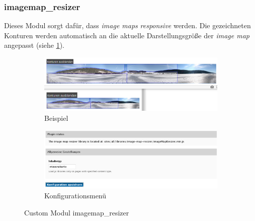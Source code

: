 \newpage
\subsubsection{imagemap\_resizer}\label{subsub:imagemapresizer}
Dieses Modul sorgt dafür, dass \textit{image maps} \textit{responsive} werden. Die gezeichneten Konturen werden automatisch an die aktuelle Darstellungsgröße der \textit{image map} angepasst (siehe \cref{fig:example_imagemapresizer}).

\begin{figure}[H]
	\centering
	\begin{subfigure}{0.45\textwidth}
		\centering
		\includegraphics[width=\linewidth]{images/example_imagemapresizer}
		\caption[]{Beispiel}
		\label{fig:example_imagemapresizer}
	\end{subfigure}
	\begin{subfigure}{0.45\textwidth}
		\centering
		\includegraphics[width=\linewidth]{images/config_imagemapresizer}
		\caption[]{Konfigurationsmenü}
		\label{fig:config_imagemapresizer}
	\end{subfigure}
	\caption{Custom Modul imagemap\_resizer}
	\label{fig:imagemap_resizer}
\end{figure}

